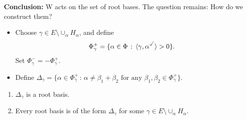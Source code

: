 \documentclass{article}
\begin{document}
\endproof
\textbf{Conclusion: } W acts on the set of root bases. \gap 
The question remains: How do we construct them? \begin{itemize}
    \item Choose $\gamma \in E \setminus \cup_{\alpha} H_{\alpha}$, and define \[ \Phi^{+}_{\gamma}=\{\alpha \in \Phi \, : \, \langle \gamma, \alpha^{\checked} \rangle >0 \}. \]
    Set $\Phi^{-}_{\gamma} = -\Phi^{+}_{\gamma}.$
    \item Define $\Delta_{\gamma} = \{ \alpha \in \Phi_{\gamma}^{+} \, : \, \alpha \neq \beta_{1} + \beta_{2} \text{ for any $\beta_{1}, \beta_{2} \in \Phi^{+}_{\gamma}$}\}$.
\end{itemize}
\begin{fancythm}{}\hspace{0.1cm}
    \begin{enumerate}
        \item $\Delta_{\gamma}$ is a root basis.
        \item Every root basis is of the form $\Delta_{\gamma}$ for some $\gamma \in E \setminus \cup_{\alpha} H_{\alpha}$.
    \end{enumerate}
\end{fancythm}
\proof \hspace{0.1cm}
\end{document}
